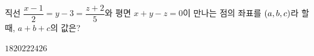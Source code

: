 직선 $\dfrac{x-1}{2}=y-3=\dfrac{z+2}{5}$와 평면 $x+y-z=0$이 만나는 점의 좌표를 $(a{,}\mkern3mu\mathopen{}b{,}\mkern3mu\mathopen{}c)$라 할 때, $a+b+c$의 값은?
\begin{choices32}{$18$}{$20$}{$22$}{$24$}{$26$}\end{choices32}
